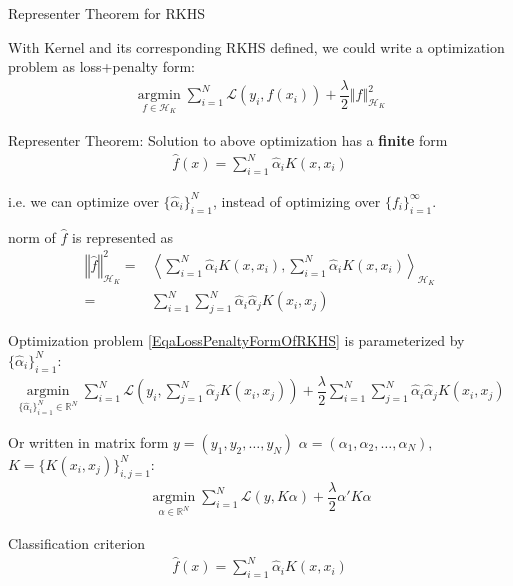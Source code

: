 \begin{point}
    Representer Theorem for RKHS
\end{point}

    With Kernel and its corresponding RKHS defined, we could write a optimization problem as loss+penalty form:
    \begin{align}\label{EqaLossPenaltyFormOfRKHS}
         \mathop{\arg\min}\limits_{f\in\mathcal{H}_K}\sum_{i=1}^N\mathcal{L}(y_i, f(x_i)) + \dfrac{\lambda }{2}\left\Vert f \right\Vert^2 _{\mathcal{H}_K}
    \end{align}

    Representer Theorem: Solution to above optimization has a \textbf{finite}  form
    \begin{align}
        \hat{f}(x)=\sum_{i=1}^N\hat{\alpha }_iK(x,x_i) 
    \end{align}

    i.e. we can optimize over $ \{\hat{\alpha }_i\}_{i=1}^N $, instead of optimizing over $ \{f_i\}_{i=1}^{\infty} $.

    norm of $ \hat{f} $ is represented as 
    \begin{align}
        \left\Vert \hat{f} \right\Vert ^2 _{\mathcal{H}_K}=&\left\langle \sum_{i=1}^N\hat{\alpha }_iK(x,x_i),\sum_{i=1}^N\hat{\alpha }_iK(x,x_i) \right\rangle _{\mathcal{H}_K}\\
        =&\sum_{i=1}^N\sum_{j=1}^N\hat{\alpha }_i\hat{\alpha }_j K(x_i,x_j)
    \end{align}

    Optimization problem \autoref{EqaLossPenaltyFormOfRKHS} is parameterized by $ \{\hat{\alpha }_i\}_{i=1}^N $:
    \begin{align}\label{EqaLossPenaltyFormOfKernel}
        \mathop{\arg\min}\limits_{\{\hat{\alpha }_i\}_{i=1}^N\in \mathbb{R}^N}\sum_{i=1}^N\mathcal{L}(y_i, \sum_{j=1}^N\hat{\alpha }_jK(x_i,x_j)) + \dfrac{\lambda }{2}\sum_{i=1}^N\sum_{j=1}^N\hat{\alpha }_i\hat{\alpha }_j K(x_i,x_j)
    \end{align}

    Or written in matrix form $ y=(y_1,y_2,\ldots,y_N) $ $ \alpha =(\alpha _{1},\alpha _{2},\ldots,\alpha _{N})  $, $ K=\{K(x_i,x_j)\}_{i,j=1}^N $:
    \begin{align}
        \mathop{\arg\min}\limits_{\alpha \in \mathbb{R}^N}\sum_{i=1}^N\mathcal{L}(y, K\alpha ) + \dfrac{\lambda }{2}\alpha 'K\alpha 
    \end{align}

    Classification criterion
    \begin{align}
        \hat{f}(x) =\sum_{i=1}^N\hat{\alpha }_iK(x,x_i)
    \end{align}
    

